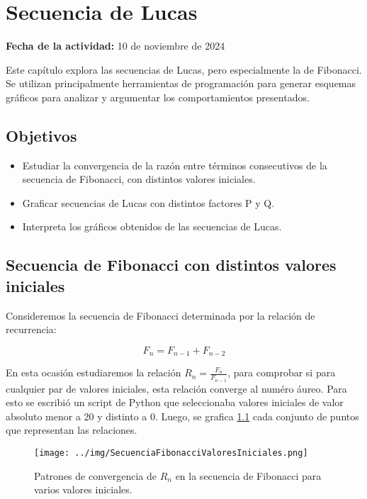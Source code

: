 \documentclass[../portafolio.tex]{subfiles}
\begin{document}
\chapter{Secuencia de Lucas}
\label{g1_ej7}
\hfill \textbf{Fecha de la actividad:} 10 de noviembre de 2024

\medskip

Este capítulo explora las secuencias de Lucas, pero especialmente la de Fibonacci. Se utilizan principalmente herramientas de programación para generar esquemas gráficos para analizar y argumentar los comportamientos presentados.

\section*{Objetivos}
\begin{itemize}
\item Estudiar la convergencia de la razón entre términos consecutivos de la secuencia de Fibonacci, con distintos valores iniciales.
\item Graficar secuencias de Lucas con distintos factores P y Q.
\item Interpreta los gráficos obtenidos de las secuencias de Lucas.
\end{itemize}
\section{Secuencia de Fibonacci con distintos valores iniciales}
Consideremos la secuencia de Fibonacci determinada por la relación de recurrencia:

\begin{equation}
F_{n}=F_{n-1}+ F_{n-2}
\end{equation}

En esta ocasión estudiaremos la relación $R_n = \frac{F_{n}}{F_{n-1}}$, para comprobar si para cualquier par de valores iniciales, esta relación converge al numéro áureo. Para esto se escribió un  script de Python que seleccionaba valores iniciales de valor absoluto menor a 20 y distinto a 0. Luego, se grafica \ref{fig:fib} cada conjunto de puntos que representan las relaciones.

\begin{figure}
\centering
\texttt{[image: ../img/SecuenciaFibonacciValoresIniciales.png]} 
\caption{Patrones de convergencia de $R_n$ en la secuencia de Fibonacci para varios valores iniciales.}\label{fig:fib}
\end{figure}
\end{document}
